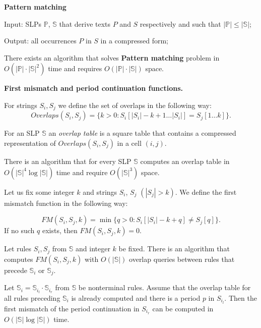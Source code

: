 \documentclass[11pt]{article}
\begin{document}
\begin{appendix}
\medskip

{\bf Pattern matching}

{\sc Input:} SLPs $\mathbb{P}$, $\mathbb{S}$ that derive texts $P$
and $S$ respectively and such that $|\mathbb{P}| \leq
|\mathbb{S}|$;

{\sc Output:} all occurrences $P$ in $S$ in a compressed form;

\begin{thm}[{\rm\cite{15}}]
There exists an algorithm that solves {\bf Pattern matching}
problem in $O(|\mathbb{P}|\cdot|\mathbb{S}|^2)$ time and requires
$O(|\mathbb{P}|\cdot|\mathbb{S}|)$ space.
\end{thm}

\medskip

{\bf First mismatch and period continuation functions.}

For strings $S_i, S_j$ we define the set of overlaps in the following way:
$$Overlaps(S_i, S_j) = \{k > 0 : S_i[|S_i| - k + 1\dots |S_i|] = S_j[1\dots k]\}.$$


For an SLP $\mathbb{S}$ an \emph{overlap table} is a square table
that contains a compressed representation of $Overlaps(S_i, S_j)$
in a cell $(i, j)$.

\begin{thm}[{\rm\cite{9}}]
There is an algorithm that for every SLP $\mathbb{S}$ computes an overlap table in
$O(|\mathbb{S}|^4\log|\mathbb{S}|)$ time and require $O(|\mathbb{S}|^3)$ space.
\end{thm}

Let us fix some integer $k$ and strings $S_i$, $S_j$ $(|S_j| >
k)$. We define the first mismatch function in the following way:

$$FM(S_i, S_j, k) = \min\{q > 0 : S_i[|S_i|-k+q] \neq S_j[q]\}.$$
If no such $q$ exists, then $FM(S_i, S_j,k) = 0$.

\begin{thm}[{\rm \cite{9}}]
Let rules $S_i, S_j$ from $\mathbb{S}$ and integer $k$ be fixed.
There is an algorithm that computes $FM(S_i, S_j, k)$ with
$O(|\mathbb{S}|)$ overlap queries between rules that precede
$\mathbb{S}_i$ or $\mathbb{S}_j$.
\end{thm}

\begin{thm}[{\rm\cite{9}}]
Let $\mathbb{S}_i = \mathbb{S}_{i_l}\cdot \mathbb{S}_{i_r}$ from
$\mathbb{S}$ be nonterminal rules. Assume that the overlap table
for all rules preceding $\mathbb{S}_i$ is already computed and
there is a period $p$ in $S_{i_l}$. Then the first mismatch of the
period continuation in $S_{i_r}$ can be computed in
$O(|\mathbb{S}|\log|\mathbb{S}|)$ time.
\end{thm}

\end{appendix}
\end{document}
